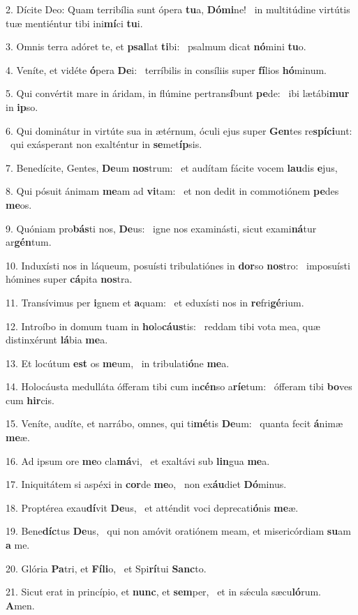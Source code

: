 2. Dícite Deo: Quam terribília sunt ópera \textbf{tu}a, \textbf{Dó}\textbf{mi}ne! \ast\  in multitúdine virtútis tuæ mentiéntur tibi ini\textbf{mí}ci \textbf{tu}i.\

3. Omnis terra adóret te, et \textbf{psal}lat \textbf{ti}bi: \ast\  psalmum dicat \textbf{nó}mini \textbf{tu}o.\

4. Veníte, et vidéte \textbf{ó}pera \textbf{De}i: \ast\  terríbilis in consíliis super \textbf{fí}lios \textbf{hó}minum.\

5. Qui convértit mare in áridam, in flúmine pertrans\textbf{í}bunt \textbf{pe}de: \ast\  ibi lætábi\textbf{mur} in \textbf{ip}so.\

6. Qui dominátur in virtúte sua in ætérnum, óculi ejus super \textbf{Gen}tes re\textbf{spí}\textbf{ci}unt: \ast\  qui exásperant non exalténtur in \textbf{se}met\textbf{íp}sis.\

7. Benedícite, Gentes, \textbf{De}um \textbf{nos}trum: \ast\  et audítam fácite vocem \textbf{lau}dis \textbf{e}jus,\

8. Qui pósuit ánimam \textbf{me}am ad \textbf{vi}tam: \ast\  et non dedit in commotiónem \textbf{pe}des \textbf{me}os.\

9. Quóniam pro\textbf{bás}ti nos, \textbf{De}us: \ast\  igne nos examinásti, sicut exami\textbf{ná}tur ar\textbf{gén}tum.\

10. Induxísti nos in láqueum, posuísti tribulatiónes in \textbf{dor}so \textbf{nos}tro: \ast\  imposuísti hómines super \textbf{cá}pita \textbf{nos}tra.\

11. Transívimus per \textbf{i}gnem et \textbf{a}quam: \ast\  et eduxísti nos in \textbf{re}fri\textbf{gé}rium.\

12. Introíbo in domum tuam in \textbf{ho}lo\textbf{cáus}tis: \ast\  reddam tibi vota mea, quæ distinxérunt \textbf{lá}bia \textbf{me}a.\

13. Et locútum \textbf{est} os \textbf{me}um, \ast\  in tribulati\textbf{ó}ne \textbf{me}a.\

14. Holocáusta medulláta ófferam tibi cum in\textbf{cén}so a\textbf{rí}\textbf{e}tum: \ast\  ófferam tibi \textbf{bo}ves cum \textbf{hir}cis.\

15. Veníte, audíte, et narrábo, omnes, qui ti\textbf{mé}tis \textbf{De}um: \ast\  quanta fecit \textbf{á}nimæ \textbf{me}æ.\

16. Ad ipsum ore \textbf{me}o cla\textbf{má}vi, \ast\  et exaltávi sub \textbf{lin}gua \textbf{me}a.\

17. Iniquitátem si aspéxi in \textbf{cor}de \textbf{me}o, \ast\  non ex\textbf{áu}diet \textbf{Dó}minus.\

18. Proptérea exau\textbf{dí}vit \textbf{De}us, \ast\  et atténdit voci deprecati\textbf{ó}nis \textbf{me}æ.\

19. Bene\textbf{díc}tus \textbf{De}us, \ast\  qui non amóvit oratiónem meam, et misericórdiam \textbf{su}am \textbf{a} me.\

20. Glória \textbf{Pa}tri, et \textbf{Fí}\textbf{li}o, \ast\  et Spi\textbf{rí}tui \textbf{Sanc}to.\

21. Sicut erat in princípio, et \textbf{nunc}, et \textbf{sem}per, \ast\  et in sǽcula sæcu\textbf{ló}rum. \textbf{A}men.\

